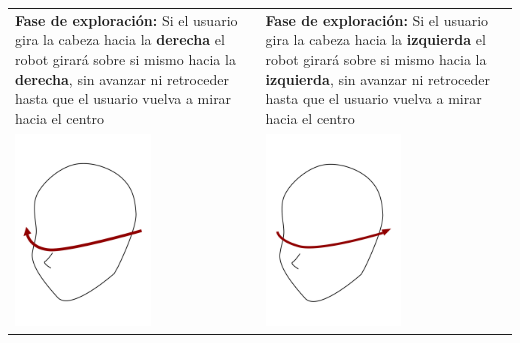 \documentclass[twoside, 11pt]{epstfg}
\begin{document}
\begin{table}[H]
	\begin{tabular}{p{7.0cm}  p{7.0cm}}
		\textbf{Fase de exploración:} Si el usuario gira la cabeza hacia la \textbf{derecha} el robot girará sobre si mismo hacia la \textbf{derecha}, sin avanzar ni retroceder hasta que el usuario vuelva a mirar hacia el centro & \textbf{Fase de exploración:} Si el usuario gira la cabeza hacia la \textbf{izquierda} el robot girará sobre si mismo hacia la \textbf{izquierda}, sin avanzar ni retroceder hasta que el usuario vuelva a mirar hacia el centro \\ 
		\centering\includegraphics[height=2in]{images/movder.png} & \centering\includegraphics[height=2in]{images/movderbuena.png} \\


		 
	\end{tabular}
\end{table}
\end{document}
